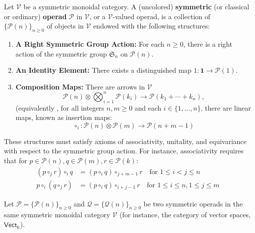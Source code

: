 \documentclass[11pt]{article}
\newcommand{\cat}[1]{\mathcal{#1}}
\theoremstyle{definition}
\begin{document}
Let $\mathcal{V}$ be a symmetric monoidal category. A (uncolored) \textbf{symmetric} (or classical or ordinary) \textbf{operad} $\cat{P}$ in $\mathcal{V}$, or a $\cat{V}$-valued operad, is a collection of $\{\cat{P}(n)\}_{n \ge 0}$ of objects in $\mathcal{V}$  endowed with the following structures:
\begin{enumerate}
    \item \textbf{A Right Symmetric Group Action:} For each $n \ge 0$, there is a right action of the symmetric group $\mathfrak{S}_n$ on $\cat{P}(n)$.
    
    \item \textbf{An Identity Element:} There exists a distinguished map $1: \mathbf{1} \to \cat{P}(1)$.
    
    \item \textbf{Composition Maps:} There are arrows in $\cat{V}$
    $$ \cat{P}(n) \otimes  \bigotimes_{i=1}^n \cat{P}(k_i) \to \cat{P}(k_1 + \cdots + k_n) ,$$
    (equivalently , for all integers $n, m \ge 0$ and each $i \in \{1, \dots, n\}$, there are linear maps, known as insertion maps:
    \[
        \circ_i : \cat{P}(n) \otimes \cat{P}(m) \to \cat{P}(n+m-1)
    \]
\end{enumerate}
These structures must satisfy axioms of associativity, unitality, and equivariance with respect to the symmetric group action. For instance, associativity requires that for $p \in \cat{P}(n), q \in \cat{P}(m), r \in \cat{P}(k)$:
\begin{align*}
    (p \circ_j r) \circ_i q &= (p \circ_i q) \circ_{j+m-1} r \quad \text{for } 1 \le i < j \le n \\
    p \circ_i (q \circ_j r) &= (p \circ_i q) \circ_{i+j-1} r \quad \text{for } 1 \le i \le n, 1 \le j \le m
\end{align*}





Let $\mathcal{P} = \{\mathcal{P}(n)\}_{n \ge 0}$ and $\mathcal{Q} = \{\mathcal{Q}(n)\}_{n \ge 0}$ be two symmetric operads in the same symmetric monoidal category $\cat{V}$ (for instance, the category of vector spaces, $\mathsf{Vect}_{\Bbbk}$).
\end{document}
